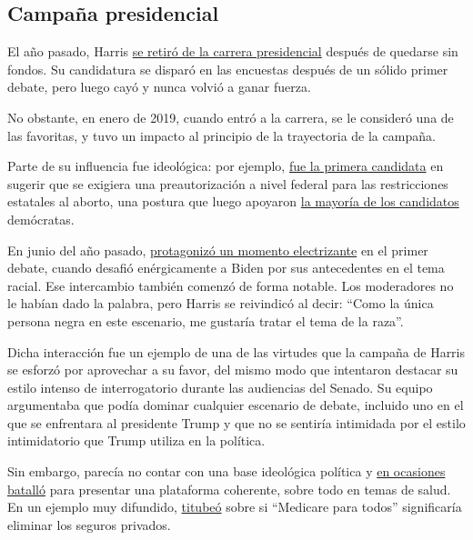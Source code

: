 \hypertarget{campauxf1a-presidencial}{%
\subsection{Campaña presidencial}\label{campauxf1a-presidencial}}

El año pasado, Harris
\href{https://www.nytimes3xbfgragh.onion/2019/12/03/us/politics/kamala-harris-campaign-drops-out.html}{se
retiró de la carrera presidencial} después de quedarse sin fondos. Su
candidatura se disparó en las encuestas después de un sólido primer
debate, pero luego cayó y nunca volvió a ganar fuerza.

No obstante, en enero de 2019, cuando entró a la carrera, se le
consideró una de las favoritas, y tuvo un impacto al principio de la
trayectoria de la campaña.

Parte de su influencia fue ideológica: por ejemplo,
\href{https://www.nytimes3xbfgragh.onion/2019/05/28/us/politics/kamala-harris-abortion.html}{fue
la primera candidata} en sugerir que se exigiera una preautorización a
nivel federal para las restricciones estatales al aborto, una postura
que luego apoyaron
\href{https://www.nytimes3xbfgragh.onion/2019/11/25/us/politics/abortion-laws-2020-democrats.html}{la
mayoría de los candidatos} demócratas.

En junio del año pasado,
\href{https://www.nytimes3xbfgragh.onion/2019/06/27/us/politics/kamala-harris-joe-biden-busing.html}{protagonizó
un momento electrizante} en el primer debate, cuando desafió
enérgicamente a Biden por sus antecedentes en el tema racial. Ese
intercambio también comenzó de forma notable. Los moderadores no le
habían dado la palabra, pero Harris se reivindicó al decir: ``Como la
única persona negra en este escenario, me gustaría tratar el tema de la
raza''.

Dicha interacción fue un ejemplo de una de las virtudes que la campaña
de Harris se esforzó por aprovechar a su favor, del mismo modo que
intentaron destacar su estilo intenso de interrogatorio durante las
audiencias del Senado. Su equipo argumentaba que podía dominar cualquier
escenario de debate, incluido uno en el que se enfrentara al presidente
Trump y que no se sentiría intimidada por el estilo intimidatorio que
Trump utiliza en la política.

Sin embargo, parecía no contar con una base ideológica política y
\href{https://www.nytimes3xbfgragh.onion/2019/07/27/us/politics/kamala-harris-2020-election.html}{en
ocasiones batalló} para presentar una plataforma coherente, sobre todo
en temas de salud. En un ejemplo muy difundido,
\href{https://www.nytimes3xbfgragh.onion/2019/06/28/upshot/kamala-harris-medicare-for-all-debate.html}{titubeó}
sobre si ``Medicare para todos'' significaría eliminar los seguros
privados.

